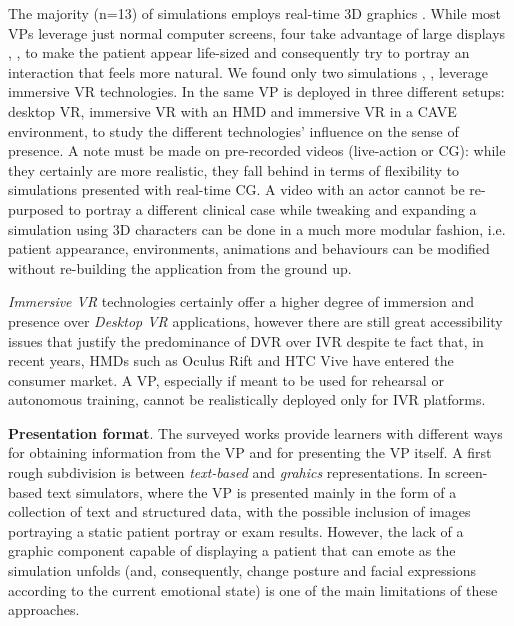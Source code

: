 The majority (n=13) of simulations employs real-time 3D graphics \cite{dupuy2019virtual,guetterman2019medical,hirumi2016advancing,banszki2018clinical,jacklin2019virtual,jeuring2015communicate,maicher2017developing,richardson2019virtual,schoenthaler2017simulated,szilas2019virtual,washburn2020virtual,zielke2016beyond,zlotos2016scenario}. While most VPs leverage just normal computer screens, four take advantage of large displays \cite{banszki2018clinical, quail2016student}, \cite{dupuy2019virtual}, \cite{washburn2020virtual} to make the patient appear life-sized and consequently try to portray an interaction that feels more natural.
We found only two simulations \cite{ochs2019training}, \cite{sapkaroski2018implementation}, leverage immersive VR technologies. In \cite{ochs2019training} the same VP is deployed in three different setups: desktop VR, immersive VR with an HMD and immersive VR in a CAVE environment, to study the different technologies' influence on the sense of presence. 
A note must be made on pre-recorded videos (live-action or CG): while they certainly are more realistic, they fall behind in terms of flexibility to simulations presented with real-time CG. A video with an actor cannot be re-purposed to portray a different clinical case while tweaking and expanding a simulation using 3D characters can be done in a much more modular fashion, i.e. patient appearance, environments, animations and behaviours can be modified without re-building the application from the ground up.\par 
\emph{Immersive VR} technologies certainly offer a higher degree of immersion and presence over \emph{Desktop VR} applications, however there are still great accessibility issues that justify the predominance of DVR over IVR despite te fact that, in recent years, HMDs such as Oculus Rift and HTC Vive have entered the consumer market. A VP, especially if meant to be used for rehearsal or autonomous training, cannot be realistically deployed only for IVR platforms. 




\textbf{Presentation format}. The surveyed works provide learners with different ways for obtaining information from the VP and for presenting the VP itself. A first rough subdivision is between \textit{text-based} and \textit{grahics} representations. In screen-based text simulators, where the VP is presented mainly in the form of a collection of text and structured data, with the possible inclusion of images portraying a static patient portray or exam results. However, the lack of a graphic component capable of displaying a patient that can emote as the simulation unfolds (and, consequently, change posture and facial expressions according to the current emotional state) is one of the main limitations of these approaches. 

